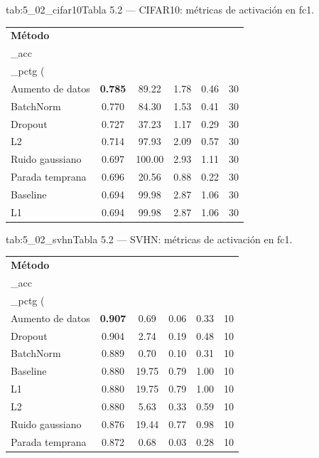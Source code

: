 \begin{table}{tab:5_02_cifar10}{Tabla 5.2 — CIFAR10: métricas de activación en fc1.}
\small
\begin{tabular}{lccccc}
\toprule
\textbf{Método} & \textbf{val\\_acc} & \textbf{uniq\\_pctg (\\%
\midrule
Aumento de datos & \textbf{0.785} & 89.22 & 1.78 & 0.46 & 30 \\
BatchNorm & 0.770 & 84.30 & 1.53 & 0.41 & 30 \\
Dropout & 0.727 & 37.23 & 1.17 & 0.29 & 30 \\
L2 & 0.714 & 97.93 & 2.09 & 0.57 & 30 \\
Ruido gaussiano & 0.697 & 100.00 & 2.93 & 1.11 & 30 \\
Parada temprana & 0.696 & 20.56 & 0.88 & 0.22 & 30 \\
Baseline & 0.694 & 99.98 & 2.87 & 1.06 & 30 \\
L1 & 0.694 & 99.98 & 2.87 & 1.06 & 30 \\
\bottomrule
\end{tabular}
\end{table}

\begin{table}{tab:5_02_svhn}{Tabla 5.2 — SVHN: métricas de activación en fc1.}
\small
\begin{tabular}{lccccc}
\toprule
\textbf{Método} & \textbf{val\\_acc} & \textbf{uniq\\_pctg (\\%
\midrule
Aumento de datos & \textbf{0.907} & 0.69 & 0.06 & 0.33 & 10 \\
Dropout & 0.904 & 2.74 & 0.19 & 0.48 & 10 \\
BatchNorm & 0.889 & 0.70 & 0.10 & 0.31 & 10 \\
Baseline & 0.880 & 19.75 & 0.79 & 1.00 & 10 \\
L1 & 0.880 & 19.75 & 0.79 & 1.00 & 10 \\
L2 & 0.880 & 5.63 & 0.33 & 0.59 & 10 \\
Ruido gaussiano & 0.876 & 19.44 & 0.77 & 0.98 & 10 \\
Parada temprana & 0.872 & 0.68 & 0.03 & 0.28 & 10 \\
\bottomrule
\end{tabular}
\end{table}


